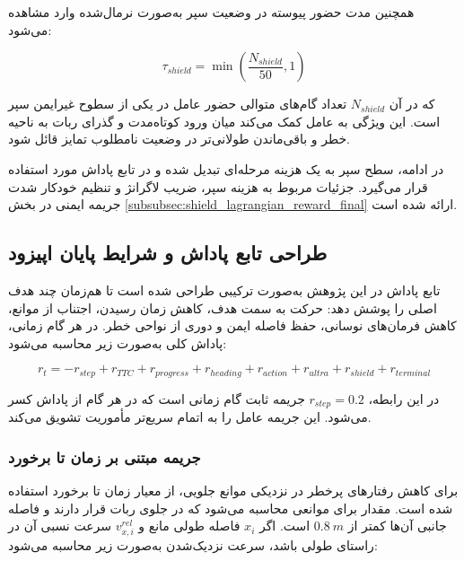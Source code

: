 همچنین مدت حضور پیوسته در وضعیت سپر به‌صورت نرمال‌شده وارد مشاهده می‌شود:

\begin{equation}
	\tau_{shield} =
	\min
	\left(
	\frac{N_{shield}}{50},
	1
	\right)
	\label{eq:shield_duration_encoding_final}
\end{equation}

که در آن \(N_{shield}\) تعداد گام‌های متوالی حضور عامل در یکی از سطوح غیرایمن سپر است. این ویژگی به عامل کمک می‌کند میان ورود کوتاه‌مدت و گذرای ربات به ناحیه خطر و باقی‌ماندن طولانی‌تر در وضعیت نامطلوب تمایز قائل شود.

در ادامه، سطح سپر به یک هزینه مرحله‌ای تبدیل شده و در تابع پاداش مورد استفاده قرار می‌گیرد. جزئیات مربوط به هزینه سپر، ضریب لاگرانژ و تنظیم خودکار شدت جریمه ایمنی در بخش \ref{subsubsec:shield_lagrangian_reward_final} ارائه شده است.

\subsection{طراحی تابع پاداش و شرایط پایان اپیزود}
\label{subsec:reward_design_final}

تابع پاداش در این پژوهش به‌صورت ترکیبی طراحی شده است تا هم‌زمان چند هدف اصلی را پوشش دهد: حرکت به سمت هدف، کاهش زمان رسیدن، اجتناب از موانع، کاهش فرمان‌های نوسانی، حفظ فاصله ایمن و دوری از نواحی خطر. در هر گام زمانی، پاداش کلی به‌صورت زیر محاسبه می‌شود:

\begin{equation}
	r_t =
	-r_{step}
	+r_{TTC}
	+r_{progress}
	+r_{heading}
	+r_{action}
	+r_{ultra}
	+r_{shield}
	+r_{terminal}
	\label{eq:total_reward_final}
\end{equation}

در این رابطه، \(r_{step}=0.2\) جریمه ثابت گام زمانی است که در هر گام از پاداش کسر می‌شود. این جریمه عامل را به اتمام سریع‌تر مأموریت تشویق می‌کند.

\subsubsection{جریمه مبتنی بر زمان تا برخورد}
\label{subsubsec:ttc_reward_final}

برای کاهش رفتارهای پرخطر در نزدیکی موانع جلویی، از معیار زمان تا برخورد استفاده شده است. مقدار  برای موانعی محاسبه می‌شود که در جلوی ربات قرار دارند و فاصله جانبی آن‌ها کمتر از \(0.8~m\) است. اگر \(x_i\) فاصله طولی مانع و \(v^{rel}_{x,i}\) سرعت نسبی آن در راستای طولی باشد، سرعت نزدیک‌شدن به‌صورت زیر محاسبه می‌شود:

